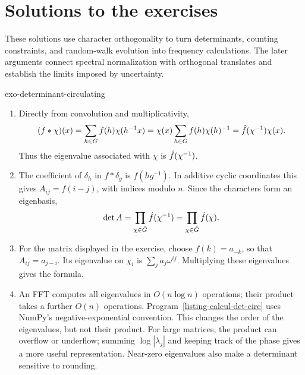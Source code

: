 \clearpage
\section{Solutions to the exercises}
\label{sec-solutions-1-finite-groups}

These solutions use character orthogonality to turn determinants, counting
constraints, and random-walk evolution into frequency calculations. The
later arguments connect spectral normalization with orthogonal translates
and establish the limits imposed by uncertainty.

\begin{correction}{exo-determinant-circulating}
\begin{enumerate}
\item Directly from convolution and multiplicativity,
\[
 (f*\chi)(x)=\sum_{h\in G}f(h)\chi(h^{-1}x)
 =\chi(x)\sum_{h\in G}f(h)\chi(h)^{-1}
 =\hat{f}(\chi^{-1})\chi(x).
\]
Thus the eigenvalue associated with $\chi$ is $\hat{f}(\chi^{-1})$.
\item The coefficient of $\delta_h$ in $f*\delta_g$ is $f(hg^{-1})$.
In additive cyclic coordinates this gives $A_{ij}=f(i-j)$, with indices
modulo $n$. Since the characters form an eigenbasis,
\[
 \det A=\prod_{\chi\in\hat{G}}\hat{f}(\chi^{-1})
       =\prod_{\chi\in\hat{G}}\hat{f}(\chi).
\]
\item For the matrix displayed in the exercise, choose $f(k)=a_{-k}$,
so that $A_{ij}=a_{j-i}$. Its eigenvalue on $\chi_i$ is
$\sum_j a_j\omega^{ij}$. Multiplying these eigenvalues gives the formula.
\item An FFT computes all eigenvalues in $O(n\log n)$ operations; their
product takes a further $O(n)$ operations. Program~\ref{listing-calcul-det-circ}
uses NumPy's negative-exponential convention. This changes the order of the
eigenvalues, but not their product. For large matrices, the product can
overflow or underflow; summing $\log|\lambda_j|$ and keeping track of the
phase gives a more useful representation. Near-zero eigenvalues also make a
determinant sensitive to rounding.
\begin{listing}[H]
\caption{A circulant determinant from its first row.}
\label{listing-calcul-det-circ}
\end{listing}
\end{enumerate}
\end{correction}

